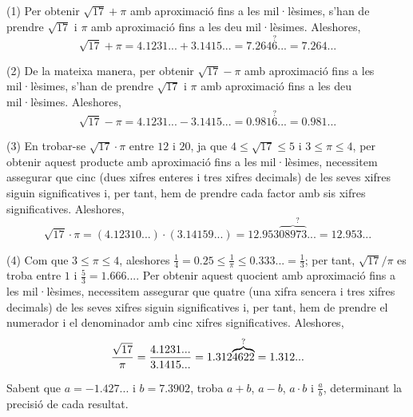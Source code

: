 \begin{solucio}
(1) Per obtenir $\sqrt{17}+\pi$ amb aproximació fins a les mil·lèsimes, s’han de prendre $\sqrt{17}$ i $\pi$ amb aproximació fins a les
deu mil·lèsimes. Aleshores,%
\begin{equation*}
\sqrt{17}+\pi =4.1231...+3.1415...=7.264\overset{?}{6}...=7.264...
\end{equation*}

(2) De la mateixa manera, per obtenir $\sqrt{17}-\pi$ amb aproximació fins a
les mil·lèsimes, s’han de prendre $\sqrt{17}$ i $\pi$ amb aproximació
fins a les deu mil·lèsimes. Aleshores,%
\begin{equation*}
\sqrt{17}-\pi =4.1231...-3.1415...=0.981\overset{?}{6}...=0.981...
\end{equation*}

(3) En trobar-se $\sqrt{17}\cdot \pi$ entre $12$ i $20$, ja que $4\leq 
\sqrt{17}\leq 5$ i $3\leq \pi \leq 4$, per obtenir aquest producte amb
aproximació fins a les mil·lèsimes, necessitem assegurar que cinc
(dues xifres enteres i tres xifres decimals) de les seves xifres siguin
significatives i, per tant, hem de prendre cada factor amb sis xifres
significatives. Aleshores,%
\begin{equation*}
\sqrt{17}\cdot \pi=\left( 4.12310...\right) \cdot \left(
3.14159...\right) =12.953\overset{?}{\overbrace{08973}...}=12.953...
\end{equation*}

(4) Com que $3\leq \pi \leq 4$, aleshores $\frac{1}{4}=0.25\leq \frac{1}{\pi }%
\leq 0.333...=\frac{1}{3}$; per tant, $\sqrt{17}/\pi$ es troba entre $%
1$ i $\frac{5}{3}=1.666...$. Per obtenir aquest quocient amb aproximació fins a les mil·lèsimes, necessitem assegurar que quatre (una xifra sencera
i tres xifres decimals) de les seves xifres siguin significatives i, per tant,
hem de prendre el numerador i el denominador amb cinc xifres significatives.
Aleshores,%
\begin{equation*}
\frac{\sqrt{17}}{\pi }=\frac{4.1231...}{3.1415...}=1.312\overset{?}{%
\overbrace{4622}}=1.312...
\end{equation*}
\end{solucio}

\begin{exercici}
Sabent que $a=-1.427...$ i $b=7.3902$, troba $a+b$, $a-b$, $a\cdot b$
i $\frac{a}{b}$, determinant la precisió de cada resultat.

\end{exercici}

